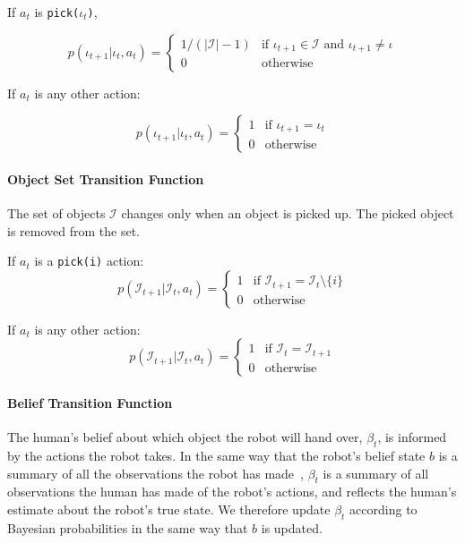 \documentclass[conference]{IEEEtran}
\newcommand{\Iota}{\mathcal{I}}
\begin{document}
If $a_t$ is \texttt{pick($\iota_t$)}, 

\begin{equation*}
	p(\iota_{t+1} | \iota_t, a_t) = \begin{cases}
		1/(|\Iota|-1) & \text{if } \iota_{t+1} \in \Iota \text{ and } \iota_{t+1} \ne \iota \\
		0 & \text{otherwise} 
	\end{cases}
\end{equation*}


If $a_t$ is any other action: 

\begin{equation*}
	p(\iota_{t+1} | \iota_t, a_t) = \begin{cases} 
		1 & \text{if $\iota_{t+1} = \iota_t$} \\
		0 & \text{otherwise}
	\end{cases}
\end{equation*}

\paragraph{Object Set Transition Function}

The set of objects $\Iota$ changes only when an object is picked up. The picked object is removed from the set. 

If $a_t$ is a \texttt{pick(i)} action: 
\begin{equation*}
	p(\Iota_{t+1} | \Iota_t, a_t) = \begin{cases}
		1 & \text{if $\Iota_{t+1} = \Iota_t \setminus \{i\}$} \\ 
		0 & \text{otherwise}
	\end{cases}
\end{equation*}


If $a_t$ is any other action: 
\begin{equation*}
	p(\Iota_{t+1} | \Iota_t, a_t) = \begin{cases}
		1 & \text{if $\Iota_{t} = \Iota_{t+1}$} \\ 
		0 & \text{otherwise}
	\end{cases}
\end{equation*}

\paragraph{Belief Transition Function}

The human's belief about which object the robot will hand over, $\beta_t$, is informed by the actions the robot takes. In the same way that the robot's belief state $b$ is a summary of all the observations the robot has made~\citep{kaelbling99}, $\beta_t$ is a summary of all observations the human has made of the robot's actions, and reflects the human's estimate about the robot's true state. We therefore update $\beta_t$ according to Bayesian probabilities in the same way that $b$ is updated. 
\end{document}
